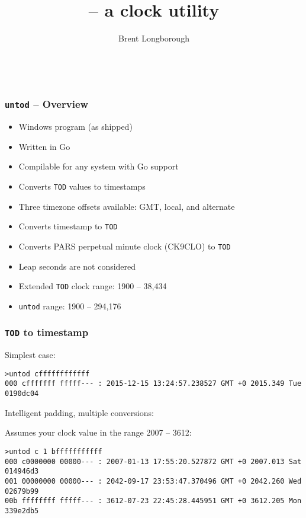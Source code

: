 \documentclass[10pt,xcolor=x11names]{beamer}
\title{\untod{} -- a \tod{} clock utility}
\author{Brent Longborough}
\date[\gitAuthorDate]{\gitAuthorDate\\\gitAbbrevHash}
\newcommand{\untod}{\texttt{untod}}
\newcommand{\tod}{\texttt{TOD}}
\begin{document}
\begin{frame}
\titlepage
\end{frame}
\begin{frame}
  \frametitle{\untod{} -- Overview}
  \begin{itemize}
  \item Windows program (as shipped)
  \item Written in Go
  \item Compilable for any system with Go support
  \item Converts \tod{} values to timestamps
  \item Three timezone offsets available: GMT, local, and alternate
  \item Converts timestamp to \tod{}
  \item Converts PARS perpetual minute clock (CK9CLO) to \tod{}
  \item Leap seconds are not considered
  \item Extended \tod{} clock range: 1900 -- 38,434
  \item \untod{} range: 1900 -- 294,176
  \end{itemize}
\end{frame}
\begin{frame}[fragile]
  \frametitle{\tod{} to timestamp}
  \begin{block}{Simplest case:}

  \begin{lstlisting}
>untod cffffffffffff
000 cfffffff fffff--- : 2015-12-15 13:24:57.238527 GMT +0 2015.349 Tue 0190dc04
  \end{lstlisting}
  \end{block}

  \begin{block}{Intelligent padding, multiple conversions:}

Assumes your clock value in the range 2007 -- 3612:

  \begin{lstlisting}
>untod c 1 bfffffffffff
000 c0000000 00000--- : 2007-01-13 17:55:20.527872 GMT +0 2007.013 Sat 014946d3
001 00000000 00000--- : 2042-09-17 23:53:47.370496 GMT +0 2042.260 Wed 02679b99
00b ffffffff fffff--- : 3612-07-23 22:45:28.445951 GMT +0 3612.205 Mon 339e2db5
  \end{lstlisting}
  \end{block}

\end{frame}
\end{document}
